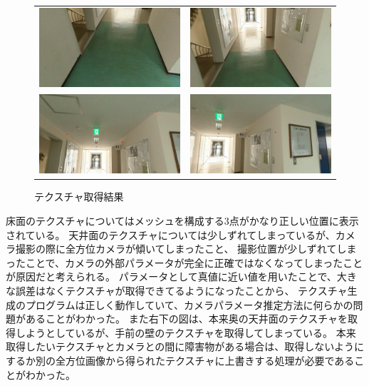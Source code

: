 \documentclass[]{jarticle}          %
\begin{document}
\begin{figure}[!ht]
  \begin{center}
    \begin{tabular}{cc}
      \includegraphics[keepaspectratio, width=0.4\linewidth]{figures/result/texture_1_1.png}&
      \includegraphics[keepaspectratio, width=0.4\linewidth]{figures/result/texture_1_3.png}\\
      \includegraphics[keepaspectratio, width=0.4\linewidth]{figures/result/texture_1_5.png}&
      \includegraphics[keepaspectratio, width=0.4\linewidth]{figures/result/texture_1_7.png}\\
    \end{tabular}
  \end{center}
  \caption{テクスチャ取得結果}
  \label{three}
\end{figure}

床面のテクスチャについてはメッシュを構成する3点がかなり正しい位置に表示されている。
天井面のテクスチャについては少しずれてしまっているが、カメラ撮影の際に全方位カメラが傾いてしまったこと、
撮影位置が少しずれてしまったことで、カメラの外部パラメータが完全に正確ではなくなってしまったことが原因だと考えられる。
パラメータとして真値に近い値を用いたことで、大きな誤差はなくテクスチャが取得できてるようになったことから、
テクスチャ生成のプログラムは正しく動作していて、カメラパラメータ推定方法に何らかの問題があることがわかった。
また右下の図は、本来奥の天井面のテクスチャを取得しようとしているが、手前の壁のテクスチャを取得してしまっている。
本来取得したいテクスチャとカメラとの間に障害物がある場合は、取得しないようにするか別の全方位画像から得られたテクスチャに上書きする処理が必要であることがわかった。
\end{document}
